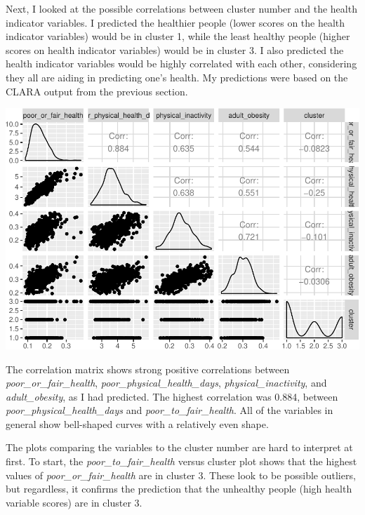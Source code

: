 \documentclass[12pt,twoside]{amherstthesis}
\begin{document}
  Next, I looked at the possible correlations between cluster number and
  the health indicator variables. I predicted the healthier people (lower
  scores on the health indicator variables) would be in cluster 1, while
  the least healthy people (higher scores on health indicator variables)
  would be in cluster 3. I also predicted the health indicator variables
  would be highly correlated with each other, considering they all are
  aiding in predicting one's health. My predictions were based on the
  CLARA output from the previous section.
  
  \begin{Shaded}
  \begin{Highlighting}[]
  \end{Highlighting}
  \end{Shaded}
  
  \begin{center}\includegraphics{Comps_Proj_files/figure-latex/unnamed-chunk-18-1} \end{center}
  
  The correlation matrix shows strong positive correlations between
  \emph{poor\_or\_fair\_health}, \emph{poor\_physical\_health\_days},
  \emph{physical\_inactivity}, and \emph{adult\_obesity}, as I had
  predicted. The highest correlation was 0.884, between
  \emph{poor\_physical\_health\_days} and \emph{poor\_to\_fair\_health}.
  All of the variables in general show bell-shaped curves with a
  relatively even shape.
  
  The plots comparing the variables to the cluster number are hard to
  interpret at first. To start, the \emph{poor\_to\_fair\_health} versus
  cluster plot shows that the highest values of
  \emph{poor\_or\_fair\_health} are in cluster 3. These look to be
  possible outliers, but regardless, it confirms the prediction that the
  unhealthy people (high health variable scores) are in cluster 3.
  
\end{document}
